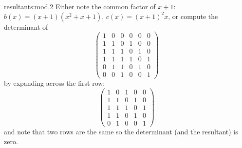 \begin{answer}{resultants:mod.2}
Either note the common factor of \(x+1\): \(b(x)=(x+1)(x^2+x+1)\), \(c(x)=(x+1)^2x\), or compute the determinant of 
\[
\begin{pmatrix}
1&0&0&0&0&0\\
1&1&0&1&0&0\\
1&1&1&0&1&0\\
1&1&1&1&0&1\\
0&1&1&0&1&0\\
0&0&1&0&0&1
\end{pmatrix}
\]
by expanding across the first row:
\[
\begin{pmatrix}
1&0&1&0&0\\
1&1&0&1&0\\
1&1&1&0&1\\
1&1&0&1&0\\
0&1&0&0&1
\end{pmatrix}
\]
and note that two rows are the same so the determinant (and the resultant) is zero.
\end{answer}


